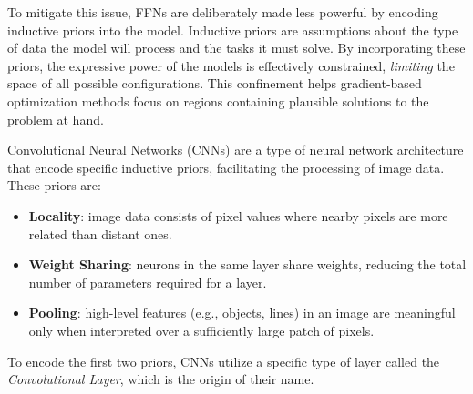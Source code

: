 To mitigate this issue, FFNs are deliberately made less powerful by encoding
inductive priors into the model. Inductive priors are assumptions about the type
of data the model will process and the tasks it must solve. By incorporating
these priors, the expressive power of the models is effectively constrained,
\emph{limiting} the space of all possible configurations. This confinement helps
gradient-based optimization methods focus on regions containing plausible
solutions to the problem at hand.

Convolutional Neural Networks (CNNs)
\cite{fukushima_neocognitron_1980} are a type of neural
network architecture that encode specific inductive priors, facilitating the
processing of image data. These priors are:
\begin{itemize}
    \item \textbf{Locality}: image data consists of pixel values where nearby
    pixels are more related than distant ones.
    \item \textbf{Weight Sharing}: neurons in the same layer share weights,
    reducing the total number of parameters required for a layer.
    \item \textbf{Pooling}: high-level features (e.g., objects, lines) in an
    image are meaningful only when interpreted over a sufficiently large patch
    of pixels.
\end{itemize}
To encode the first two priors, CNNs utilize a specific type of
layer called the
\emph{Convolutional Layer}, which is the origin of their name.


